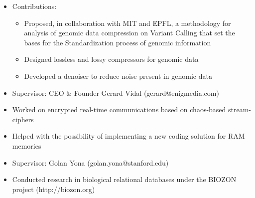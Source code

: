 \documentclass[11pt,a4paper,sans]{moderncv}        %
\begin{document}
\begin{itemize}
\item {Contributions:}
\begin{itemize}
\item Proposed, in collaboration with MIT and EPFL, a methodology for analysis of genomic data compression on Variant Calling that set the bases for the Standardization process of genomic information
\item Designed lossless and lossy compressors for genomic data
\item Developed a denoiser to reduce noise present in genomic data \\
\end{itemize}
\end{itemize}

\begin{itemize}
\item Supervisor: CEO \& Founder Gerard Vidal (gerard@enigmedia.com)
\item Worked on encrypted real-time communications based on chaos-based stream-ciphers
\end{itemize}
\vspace{10pt}

\begin{itemize}
\item Helped with the possibility of implementing a new coding solution for RAM memories
\end{itemize}
\vspace{10pt}

\begin{itemize}
\item Supervisor: Golan Yona (golan.yona@stanford.edu)
\item Conducted research in biological relational databases under the BIOZON project (http://biozon.org)
\end{itemize}
\vspace{10pt}
\end{document}
